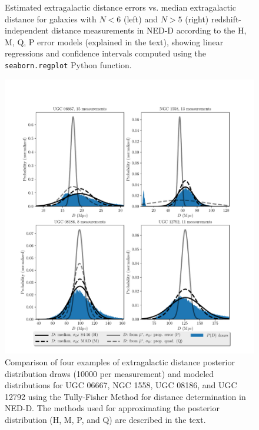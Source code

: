 \documentclass[a4paper,fleqn,usenatbib]{mnras}
\begin{document}
\begin{figure}
    \caption{Estimated extragalactic distance errors vs. median extragalactic distance for galaxies with $N<6$ (left) and $N>5$ (right)  redshift-independent distance measurements in NED-D according to the H, M, Q, P error models  (explained in the text), showing linear regressions and confidence intervals computed using the \texttt{seaborn.regplot} Python function.}
    \label{fig:NED}
\end{figure}

\begin{figure}

	\includegraphics[scale=0.69]{comp}
    \caption{Comparison of four examples of extragalactic distance posterior distribution draws (10000 per measurement) and modeled distributions for UGC 06667, NGC 1558, UGC 08186, and UGC 12792 using the Tully-Fisher Method for distance determination in NED-D. The methods used for approximating the posterior distribution (H, M, P, and Q) are described in the text. }
    \label{fig:comp}
\end{figure}
\end{document}
